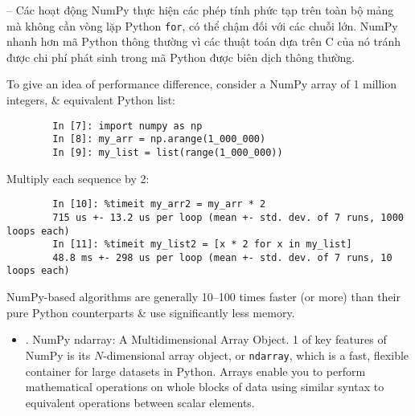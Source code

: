 \documentclass{article}
\begin{document}
\begin{itemize}
\begin{itemize}
		-- Các hoạt động NumPy thực hiện các phép tính phức tạp trên toàn bộ mảng mà không cần vòng lặp Python {\tt for}, có thể chậm đối với các chuỗi lớn. NumPy nhanh hơn mã Python thông thường vì các thuật toán dựa trên C của nó tránh được chi phí phát sinh trong mã Python được biên dịch thông thường.
	\end{itemize}
	To give an idea of performance difference, consider a NumPy array of 1 million integers, \& equivalent Python list:
	\begin{verbatim}
		In [7]: import numpy as np
		In [8]: my_arr = np.arange(1_000_000)
		In [9]: my_list = list(range(1_000_000))
	\end{verbatim}
	Multiply each sequence by 2:
	\begin{verbatim}
		In [10]: %timeit my_arr2 = my_arr * 2
		715 us +- 13.2 us per loop (mean +- std. dev. of 7 runs, 1000 loops each)
		In [11]: %timeit my_list2 = [x * 2 for x in my_list]
		48.8 ms +- 298 us per loop (mean +- std. dev. of 7 runs, 10 loops each)
	\end{verbatim}
	NumPy-based algorithms are generally 10--100 times faster (or more) than their pure Python counterparts \& use significantly less memory.
	\begin{itemize}
		\item {. NumPy ndarray: A Multidimensional Array Object.} 1 of key features of NumPy is its $N$-dimensional array object, or {\tt ndarray}, which is a fast, flexible container for large datasets in Python. Arrays enable you to perform mathematical operations on whole blocks of data using similar syntax to equivalent operations between scalar elements.
		

\end{itemize}
\end{itemize}
\end{document}
